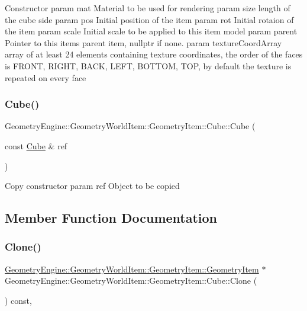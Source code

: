 Constructor param mat Material to be used for rendering param size length of the cube side param pos Initial position of the item param rot Initial rotaion of the item param scale Initial scale to be applied to this item model param parent Pointer to this items parent item, nullptr if none. param texture\+Coord\+Array array of at least 24 elements containing texture coordinates, the order of the faces is F\+R\+O\+NT, R\+I\+G\+HT, B\+A\+CK, L\+E\+FT, B\+O\+T\+T\+OM, T\+OP, by default the texture is repeated on every face \mbox{\label{class_geometry_engine_1_1_geometry_world_item_1_1_geometry_item_1_1_cube_a159c3e7e79d19df2a9857fc6b77d5955}} 
\subsubsection{\texorpdfstring{Cube()}{Cube()}\hspace{0.1cm}{\footnotesize\ttfamily [2/2]}}
{\footnotesize\ttfamily Geometry\+Engine\+::\+Geometry\+World\+Item\+::\+Geometry\+Item\+::\+Cube\+::\+Cube (\begin{DoxyParamCaption}\item[{const \mbox{\hyperlink{class_geometry_engine_1_1_geometry_world_item_1_1_geometry_item_1_1_cube}{Cube}} \&}]{ref }\end{DoxyParamCaption})}

Copy constructor param ref Object to be copied 

\subsection{Member Function Documentation}
\mbox{\label{class_geometry_engine_1_1_geometry_world_item_1_1_geometry_item_1_1_cube_ab151cd962c45bc06d21e9e26c2d1c4aa}} 
\subsubsection{\texorpdfstring{Clone()}{Clone()}}
{\footnotesize\ttfamily \mbox{\hyperlink{class_geometry_engine_1_1_geometry_world_item_1_1_geometry_item_1_1_geometry_item}{Geometry\+Engine\+::\+Geometry\+World\+Item\+::\+Geometry\+Item\+::\+Geometry\+Item}} $\ast$ Geometry\+Engine\+::\+Geometry\+World\+Item\+::\+Geometry\+Item\+::\+Cube\+::\+Clone (\begin{DoxyParamCaption}{ }\end{DoxyParamCaption}) const\hspace{0.3cm}{\ttfamily [override]}, {\ttfamily [virtual]}}

